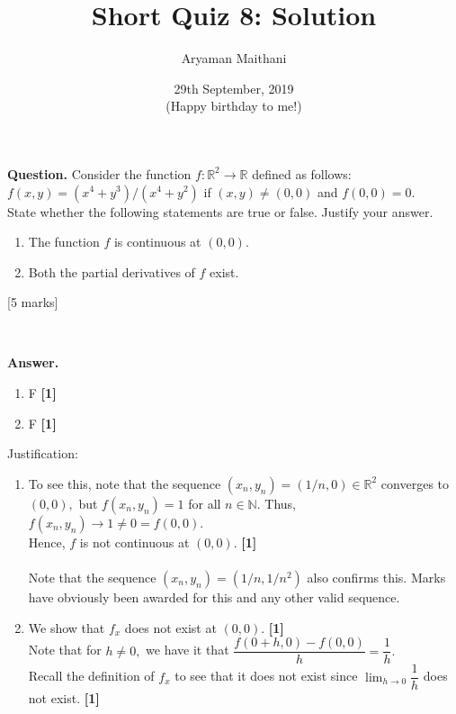 \documentclass{article}
\title{Short Quiz 8: Solution}      %
\author{Aryaman Maithani}
\date{29th September, 2019 \\ \tiny (Happy birthday to me!)}  		 %
\begin{document}
\maketitle

\hrulefill

\textbf{Question.} Consider the function $f:\mathbb{R}^2 \to \mathbb{R}$ defined as follows: $f(x, y) = (x^4 + y^3)/(x^4 + y^2)$ if $(x, y) \neq (0, 0)$ and $f(0, 0) = 0.$ \\
State whether the following statements are true or false. Justify your answer.
\begin{enumerate}[label = (\alph*)] 
	\item The function $f$ is continuous at $(0,0).$
	\item Both the partial derivatives of $f$ exist.
\end{enumerate}
\hfill [5 marks]
\begin{flushright}
	\\
\end{flushright}

\hrulefill

\textbf{Answer.} 
\begin{enumerate}[label = (\alph*), nosep] 
	\item F \hfill \textbf{[1]}
	\item F \hfill \textbf{[1]}\\
\end{enumerate}

Justification:
\begin{enumerate}[label = (\alph*)] 
	\item To see this, note that the sequence $(x_n, y_n) = (1/n, 0) \in \mathbb{R}^2$ converges to $(0,0),$ but $f(x_n, y_n) = 1$ for all $n \in \mathbb{N}.$ Thus, $f(x_n, y_n) \to 1 \neq 0 = f(0, 0).$\\
	Hence, $f$ is not continuous at $(0, 0).$ \hfill \textbf{[1]}\\~\\
	Note that the sequence $(x_n, y_n) = (1/n, 1/n^2)$ also confirms this. Marks have obviously been awarded for this and any other valid sequence.
	\item We show that $f_x$ does not exist at $(0, 0).$ \hfill \textbf{[1]}\\
	Note that for $h \neq 0,$ we have it that $\dfrac{f(0 + h, 0) - f(0, 0)}{h} = \dfrac{1}{h}.$\\
	Recall the definition of $f_x$ to see that it does not exist since $\displaystyle\lim_{h\to 0}\dfrac{1}{h}$ does not exist. \hfill \textbf{[1]}
\end{enumerate}
\hrulefill
\end{document}
